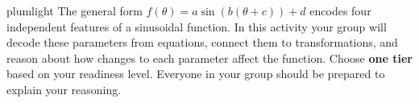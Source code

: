 \documentclass[10pt]{article}
\begin{document}
\namepartnerperiod

\vspace{0.10in}

\begin{scenariobox}{plumlight}
The general form $f(\theta)=a\sin(b(\theta+c))+d$ encodes four independent
features of a sinusoidal function. In this activity your group will decode
these parameters from equations, connect them to transformations, and reason
about how changes to each parameter affect the function. Choose \textbf{one
tier} based on your readiness level. Everyone in your group should be prepared
to explain your reasoning.
\end{scenariobox}

\vspace{0.08in}
\end{document}

